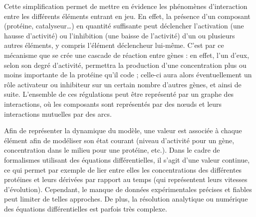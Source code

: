 Cette simplification permet de mettre en évidence les phénomènes d'interaction entre
les différents éléments entrant en jeu.
En effet, la présence d'un composant (protéine, catalyseur…)
en quantité suffisante peut déclencher
l'activation (une hausse d'activité) ou l'inhibition (une baisse de l'activité)
d'un ou plusieurs autres éléments, y compris l'élément déclencheur lui-même.
C'est par ce mécanisme que se crée une cascade de réaction entre gènes :
en effet, l'un d'eux, selon son degré d'activité,
permettra la production d'une concentration plus ou moins importante de la protéine qu'il code ;
celle-ci aura alors éventuellement un rôle activateur ou inhibiteur sur un certain
nombre d'autres gènes, et ainsi de suite.
L'ensemble de ces régulations peut être représenté par un graphe des interactions,
où les composants sont représentés par des nœuds et leurs interactions mutuelles par des arcs.


Afin de représenter la dynamique du modèle,
une valeur est associée à chaque élément afin de modéliser
son état courant
(niveau d'activité pour un gène,
concentration dans le milieu pour une protéine, etc.).
Dans le cadre de formalismes utilisant des équations différentielles,
il s'agit d'une valeur continue,
ce qui permet par exemple de lier entre elles
les concentrations des différentes protéines et leurs dérivées par rapport au temps
(qui représentent leurs vitesses d'évolution). 
Cependant, le manque de données expérimentales précises et fiables peut limiter de telles
approches.
De plus, la résolution analytique ou numérique des équations différentielles est parfois
très complexe.


